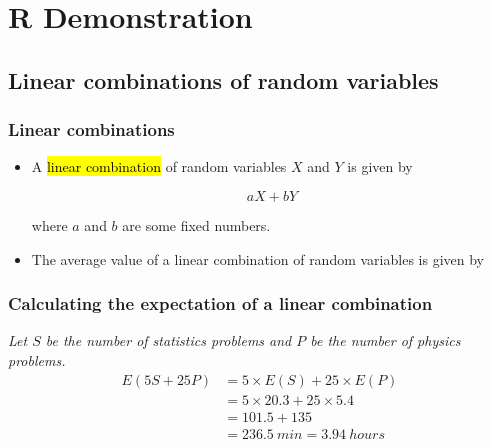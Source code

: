 \documentclass[slidestop,compress,mathserif]{beamer}
\newcommand{\soln}[1]{\textit{#1}}
\begin{document}

\section{R Demonstration}



\subsection{Linear combinations of random variables}


\begin{frame}
\frametitle{Linear combinations}

\begin{itemize}

\item A \hl{linear combination} of random variables $X$ and $Y$ is given by

\[ aX + bY \]

where $a$ and $b$ are some fixed numbers.

\pause

\item The average value of a linear combination of random variables is given by
\formula{\[ E(aX + bY) = a \times E(X) + b \times E(Y) \]}

\end{itemize}

\end{frame}


\begin{frame}
\frametitle{Calculating the expectation of a linear combination}


\soln{
\pause
Let $S$ be the number of statistics problems and $P$ be the number of physics problems. 
\begin{align*} 
E(5S+25P) &= 5 \times E(S) + 25 \times E(P) \\
&= 5 \times 20.3 + 25 \times 5.4 \\
&= 101.5 + 135 \\
&= 236.5~min = 3.94~hours
\end{align*}
}

\end{frame}
\end{document}
